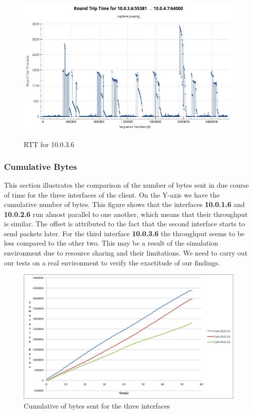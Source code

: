 \documentclass[a4paper,11pt]{article}
\begin{document}
			\begin{figure}[h!]
				\begin{center}
					\label{fig:rtt3}
					\includegraphics[scale=0.45]{pictures/rtt3.jpeg}
					\caption[]{RTT for 10.0.3.6}
				\end{center}
			\end{figure}

			\clearpage
			\subsubsection{Cumulative Bytes}
			\label{subsubsec:cumbytes}
			This section illustrates the comparison of the number of bytes sent in due course of time for the three interfaces of the client. On the Y-axis we have the cumulative number of bytes. This figure shows that the interfaces \textbf{10.0.1.6} and \textbf{10.0.2.6} run almost parallel to one another, which means that their throughput is similar. The offset is attributed to the fact that the second interface starts to send packets later. For the third interface \textbf{10.0.3.6} the throughput seems to be less compared to the other two. This may be a result of the simulation environment due to resource sharing and their limitations. We need to carry out our tests on a real environment to verify the exactitude of our findings.
			\begin{figure}[h!]
				\centering
					\label{fig:cumbytes}
					\includegraphics[scale=0.5]{pictures/cumbytes.jpg}
					\caption[]{Cumulative of bytes sent for the three interfaces}
			\end{figure}
\end{document}
